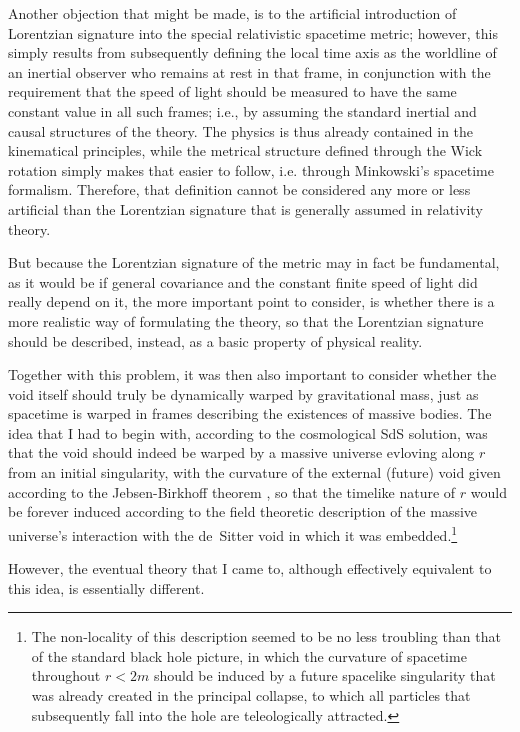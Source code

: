Another objection that might be made, is to the artificial introduction of Lorentzian signature into the special relativistic spacetime metric; however, this simply results from subsequently defining the local time axis as the worldline of an inertial observer who remains at rest in that frame, in conjunction with the requirement that the speed of light should be measured to have the same constant value in all such frames; i.e., by assuming the standard inertial and causal structures of the theory. The physics is thus already contained in the kinematical principles, while the metrical structure defined through the Wick rotation simply makes that easier to follow, i.e. through Minkowski's spacetime formalism. Therefore, that definition cannot be considered any more or less artificial than the Lorentzian signature that is generally assumed in relativity theory.

But because the Lorentzian signature of the metric may in fact be fundamental, as it would be if general covariance and the constant finite speed of light did really depend on it, the more important point to consider, is whether there is a more realistic way of formulating the theory, so that the Lorentzian signature should be described, instead, as a basic property of physical reality. 

Together with this problem, it was then also important to consider whether the void itself should truly be dynamically warped by gravitational mass, just as spacetime is warped in frames describing the existences of massive bodies. The idea that I had to begin with, according to the cosmological SdS solution, was that the void should indeed be warped by a massive universe evloving along $r$ from an initial singularity, with the curvature of the external (future) void given according to the Jebsen-Birkhoff theorem \cite{Jebsen1921,Jebsen2005,Birkhoff1923}, so that the timelike nature of $r$ would be forever induced according to the field theoretic description of the massive universe's interaction with the de~Sitter void in which it was embedded.\footnote{The non-locality of this description seemed to be no less troubling than that of the standard black hole picture, in which the curvature of spacetime throughout $r<2m$ should be induced by a future spacelike singularity that was already created in the principal collapse, to which all particles that subsequently fall into the hole are teleologically attracted.}

However, the eventual theory that I came to, although effectively equivalent to this idea, is essentially different.

